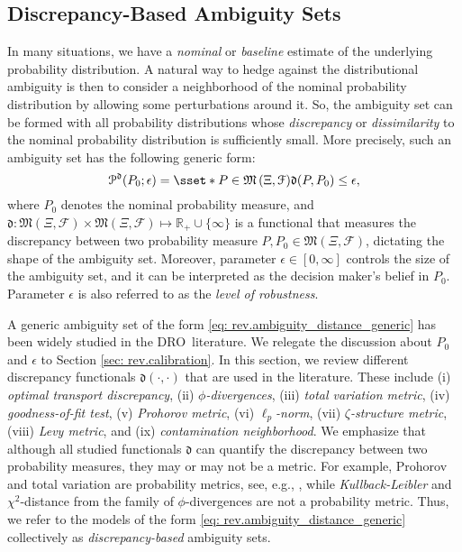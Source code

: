 \documentclass[final,onefignum,onetabnum]{class}
\newcommand{\Bs}[1]{\mathbb{#1}} %
\newcommand{\Cs}[1]{\mathcal{#1}} %
\newcommand{\Fs}[1]{\mathfrak{#1}} %
\newcommand{\measurespace}{\left( \Xi, \Cs{F} \right)}
\newcommand{\dro}{DRO}
\begin{document}
\subsection{Discrepancy-Based Ambiguity Sets}
\label{sec: rev.distance}

In many situations, we have a {\it nominal} or {\it baseline} estimate of the underlying probability distribution. A natural way to hedge against  the distributional ambiguity is then to consider a neighborhood of the nominal  probability distribution by allowing some perturbations around it. So, the ambiguity set can be formed with all probability distributions whose {\it discrepancy} or {\it dissimilarity} to the nominal probability distribution is sufficiently small. More precisely, such an ambiguity set has the following generic form:
\begin{equation}
    \label{eq: rev.ambiguity_distance_generic}
    \Cs{P}^{\Fs{d}}(P_{0};\epsilon)=\sset*{P \in \Fs{M}\measurespace}{\Fs{d} (P,P_{0}) \le \epsilon},
\end{equation}
where $P_{0}$ denotes the nominal probability measure, and  $\Fs{d} : \Fs{M}\measurespace \times \Fs{M}\measurespace \mapsto \Bs{R}_{+} \cup \{\infty\}$ is a  functional that measures the discrepancy between two probability measure $P, P_{0} \in \Fs{M}\measurespace$, dictating the shape of the ambiguity set. Moreover, parameter $\epsilon \in [0, \infty]$ controls the size of the ambiguity set, and it can be interpreted as the decision maker's belief in $P_{0}$. Parameter $\epsilon$ is also referred to as the {\it level of robustness}.  

A generic ambiguity set of the form \eqref{eq: rev.ambiguity_distance_generic} has been widely studied in the \dro\ literature. 
We relegate the discussion about $P_{0}$ and $\epsilon$ to Section \ref{sec: rev.calibration}. In this section, we review different discrepancy functionals $\Fs{d}(\cdot, \cdot)$ that are used in the literature. These include
(i) {\it optimal transport discrepancy}, (ii) {\it $\phi$-divergences}, (iii) {\it total variation metric}, (iv) {\it goodness-of-fit test}, (v) {\it Prohorov metric}, (vi) {\it $\ell_{p}$-norm}, (vii) {\it $\zeta$-structure metric}, (viii) {\it Levy metric}, and (ix) {\it contamination neighborhood}. We emphasize that although all studied functionals $\Fs{d}$ can quantify the discrepancy  between two probability measures, they may or may not be a metric. For example, Prohorov and total variation are probability metrics, see, e.g.,  \citet{gibbs2002}, while {\it Kullback-Leibler} and {$\chi^{2}$-distance} from the family of $\phi$-divergences are not a probability metric. Thus, we refer to the models of the form \eqref{eq: rev.ambiguity_distance_generic} collectively as   {\it  discrepancy-based} ambiguity sets.  
\end{document}
